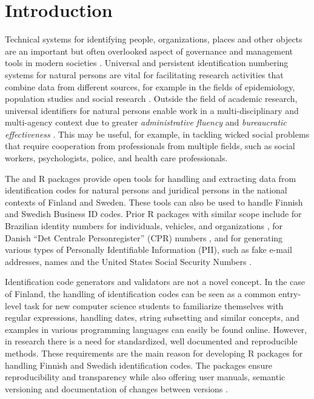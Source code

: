 \section{Introduction}\label{introduction}

Technical systems for identifying people, organizations, places and other objects are an important but often overlooked aspect of governance and management tools in modern societies \citep{dodge2005}. Universal and persistent identification numbering systems for natural persons are vital for facilitating research activities that combine data from different sources, for example in the fields of epidemiology, population studies and social research \citep{gissler2004}. Outside the field of academic research, universal identifiers for natural persons enable work in a multi-disciplinary and multi-agency context due to greater \emph{administrative fluency} and \emph{bureaucratic effectiveness} \citep{alastalo2022}. This may be useful, for example, in tackling wicked social problems that require cooperation from professionals from multiple fields, such as social workers, psychologists, police, and health care professionals.

The  and  R packages provide open tools for handling and extracting data from identification codes for natural persons and juridical persons in the national contexts of Finland and Sweden. These tools can also be used to handle Finnish and Swedish Business ID codes. Prior R packages with similar scope include  for Brazilian identity numbers for individuals, vehicles, and organizations \citep{numbersbr},  for Danish ``Det Centrale Personregister'' (CPR) numbers \citep{cprr}, and  for generating various types of Personally Identifiable Information (PII), such as fake e-mail addresses, names and the United States Social Security Numbers \citep{generator}.

Identification code generators and validators are not a novel concept. In the case of Finland, the handling of identification codes can be seen as a common entry-level task for new computer science students to familiarize themselves with regular expressions, handling dates, string subsetting and similar concepts, and examples in various programming languages can easily be found online. However, in research there is a need for standardized, well documented and reproducible methods. These requirements are the main reason for developing R packages for handling Finnish and Swedish identification codes. The packages ensure reproducibility and transparency while also offering user manuals, semantic versioning and documentation of changes between versions \citep[as outlined by][]{wickham2024}.

